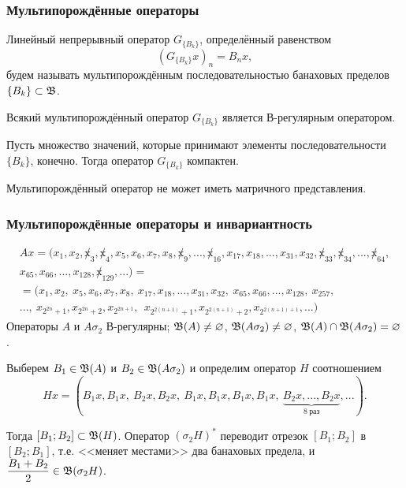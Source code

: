 \begin{frame}\frametitle{{Мультипорождённые операторы}}
	\begin{ddefinition}
		Линейный непрерывный оператор $G_{\{B_k\}}$, определённый равенством
		\begin{equation}
			(G_{\{B_k\}}x)_n = B_n x
			,
		\end{equation}
		будем называть мультипорождённым последовательностью банаховых пределов $\{B_k\}\subset \mathfrak{B}$.
	\end{ddefinition}
	\vfill

	\begin{llemma}
		Всякий мультипорождённый оператор $G_{\{B_k\}}$ является В-регулярным оператором.
	\end{llemma}
	\vfill

	\begin{llemma}
		Пусть множество значений, которые принимают элементы последовательности ${\{B_k\}}$, конечно.
		Тогда оператор $G_{\{B_k\}}$ компактен.
	\end{llemma}
	\vfill

	\begin{ttheorem}
		Мультипорождённый оператор не может иметь матричного представления.
	\end{ttheorem}

\end{frame}


\begin{frame}\frametitle{{Мультипорождённые операторы и инвариантность}}
	\begin{multline}
		Ax = (x_1, x_2, \not x_3, \not x_4, x_5, x_6, x_7, x_8, \not x_9, ..., \not x_{16}, x_{17}, x_{18}, ..., x_{31}, x_{32}, \not x_{33}, \not x_{34}, ..., \not x_{64},
		\\
		x_{65}, x_{66}, ..., x_{128}, \not x_{129}, ...)=
		\\=
		(x_1, x_2, \ x_5, x_6, x_7, x_8, \ x_{17}, x_{18}, ..., x_{31}, x_{32}, \ x_{65}, x_{66}, ..., x_{128}, \ x_{257},
		\\
		..., \ x_{2^{2n} +1}, x_{2^{2n} +2},  x_{2^{2n+1}}, \ \ x_{2^{2(n+1)} +1},  x_{2^{2(n+1)} +2},  x_{2^{2(n+1)+1}}, ...)
	\end{multline}
	Операторы $A$ и $A\sigma_2$ В-регулярны; $\mathfrak{B}(A) \ne\varnothing$, $\mathfrak{B}(A\sigma_2) \ne\varnothing$,
	$\mathfrak{B}(A) \cap \mathfrak{B}(A\sigma_2) =\varnothing$.

	\vfill

	Выберем $B_1 \in \mathfrak{B} (A)$ и $B_2 \in \mathfrak{B}(A\sigma_2)$ и определим оператор $H$ соотношением
	\begin{equation}
		Hx = (B_1 x, B_1 x, \ B_2 x, B_2 x, \ B_1 x, B_1 x, B_1 x, B_1 x, \ \underbrace{B_2 x, ..., B_2 x}_{8~\mbox{раз}}, ...)
		.
	\end{equation}

	Тогда $[B_1; B_2]\subset \mathfrak{B}(H)$.
	Оператор $(\sigma_2 H)^*$ переводит отрезок $[B_1; B_2]$ в $[B_2; B_1]$,
	т.е. <<меняет местами>> два банаховых предела,
	и $\dfrac{B_1 + B_2}2 \in \mathfrak{B}(\sigma_2 H)$.
\end{frame}

